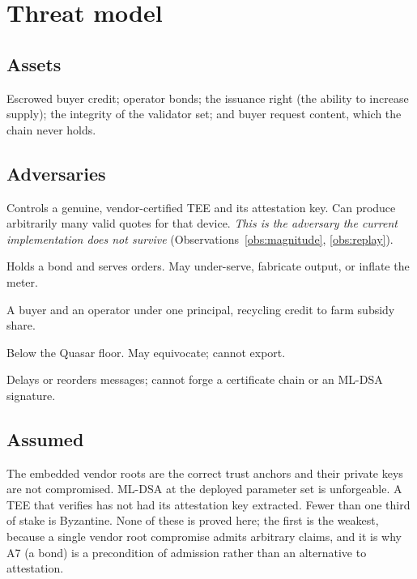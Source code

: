 \documentclass[11pt,a4paper]{article}
\theoremstyle{definition}
\theoremstyle{remark}
\begin{document}
\section{Threat model}
\label{sec:threat}

\subsection{Assets}

Escrowed buyer credit; operator bonds; the issuance right (the ability to
increase supply); the integrity of the validator set; and buyer request content,
which the chain never holds.

\subsection{Adversaries}

\begin{description}[leftmargin=1.6em,style=nextline]
\item[A device holder.] Controls a genuine, vendor-certified TEE and its
attestation key. Can produce arbitrarily many valid quotes for that device.
\emph{This is the adversary the current implementation does not survive}
(Observations~\ref{obs:magnitude}, \ref{obs:replay}).
\item[A registered operator.] Holds a bond and serves orders. May under-serve,
fabricate output, or inflate the meter.
\item[A self-dealing pair.] A buyer and an operator under one principal,
recycling credit to farm subsidy share.
\item[A validator minority.] Below the Quasar floor. May equivocate; cannot
export.
\item[A network adversary.] Delays or reorders messages; cannot forge a
certificate chain or an ML-DSA signature.
\end{description}

\subsection{Assumed}

The embedded vendor roots are the correct trust anchors and their private keys
are not compromised. ML-DSA at the deployed parameter set is unforgeable. A TEE
that verifies has not had its attestation key extracted. Fewer than one third of
stake is Byzantine. None of these is proved here; the first is the weakest,
because a single vendor root compromise admits arbitrary claims, and it is why
A7 (a bond) is a precondition of admission rather than an alternative to
attestation.
\end{document}
